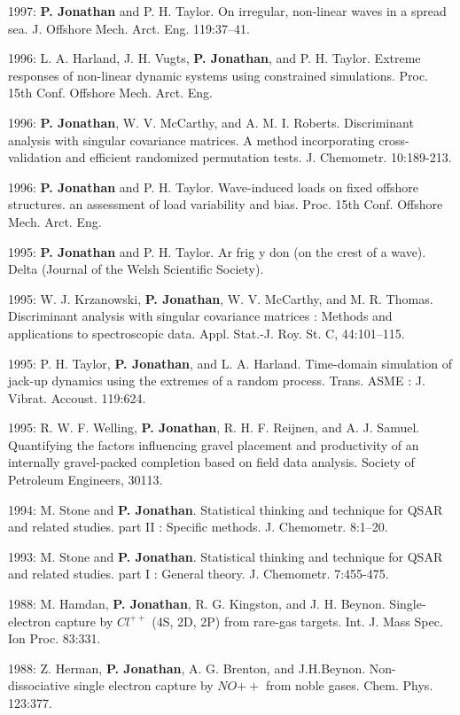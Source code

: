 \documentclass[11pt,a4paper]{moderncv}
\begin{document}
1997: \textbf{P. Jonathan} and P. H. Taylor. On irregular, non-linear waves in a spread sea. J. Offshore Mech. Arct. Eng. 119:37--41.

1996: L. A. Harland, J. H. Vugts, \textbf{P. Jonathan}, and P. H. Taylor. Extreme responses of non-linear dynamic systems using constrained simulations. Proc. 15th Conf. Offshore Mech. Arct. Eng.

1996: \textbf{P. Jonathan}, W. V. McCarthy, and A. M. I. Roberts. Discriminant analysis with singular covariance matrices. A method incorporating cross-validation and efficient randomized permutation tests. J. Chemometr. 10:189-213.

1996: \textbf{P. Jonathan} and P. H. Taylor. Wave-induced loads on fixed offshore structures. an assessment of load variability and bias. Proc. 15th Conf. Offshore Mech. Arct. Eng.

1995: \textbf{P. Jonathan} and P. H. Taylor. Ar frig y don (on the crest of a wave). Delta (Journal of the Welsh Scientific Society).

1995: W. J. Krzanowski, \textbf{P. Jonathan}, W. V. McCarthy, and M. R. Thomas. Discriminant analysis with singular covariance matrices : Methods and applications to spectroscopic data. Appl. Stat.-J. Roy. St. C, 44:101--115.

1995: P. H. Taylor, \textbf{P. Jonathan}, and L. A. Harland. Time-domain simulation of jack-up dynamics using the extremes of a random process. Trans. ASME : J. Vibrat. Accoust. 119:624.

1995: R. W. F. Welling, \textbf{P. Jonathan}, R. H. F. Reijnen, and A. J. Samuel. Quantifying the factors influencing gravel placement and productivity of an internally gravel-packed completion based on field data analysis. Society of Petroleum Engineers, 30113.

1994: M. Stone and \textbf{P. Jonathan}. Statistical thinking and technique for QSAR and related studies. part II : Specific methods. J. Chemometr. 8:1--20.

1993: M. Stone and \textbf{P. Jonathan}. Statistical thinking and technique for QSAR and related studies. part I : General theory. J. Chemometr. 7:455-475.

1988: M. Hamdan, \textbf{P. Jonathan}, R. G. Kingston, and J. H. Beynon. Single-electron capture by $Cl^{++}$ (4S, 2D, 2P) from rare-gas targets. Int. J. Mass Spec. Ion Proc. 83:331.

1988: Z. Herman, \textbf{P. Jonathan}, A. G. Brenton, and J.H.Beynon. Non-dissociative single electron capture by $NO{++}$ from noble gases. Chem. Phys. 123:377.
\end{document}
